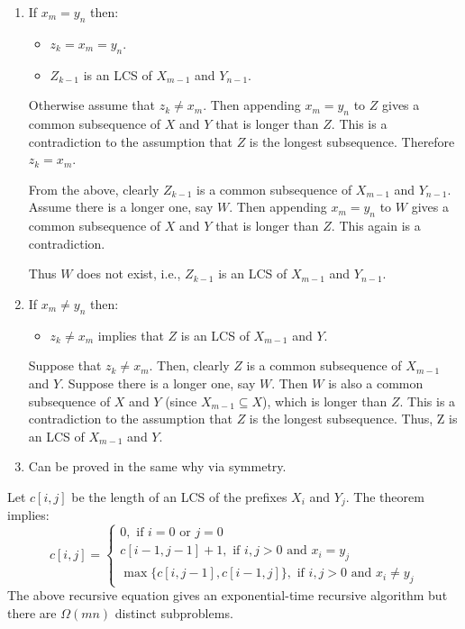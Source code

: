 {\begin{enumerate}
    \item If \(x_m = y_n\) then:
        \begin{itemize}
            \item \(z_k = x_m = y_n\).
            \item \(Z_{k-1}\) is an LCS of \(X_{m-1}\) and \(Y_{n-1}\).
        \end{itemize}
        Otherwise assume that \(z_k \neq x_m\). 
        Then appending \(x_m = y_n\) to \(Z\) gives a common subsequence of \(X\) and \(Y\) that is longer than \(Z\).
        This is a contradiction to the assumption that \(Z\) is the longest subsequence.
        Therefore \(z_k = x_m\).

        From the above, clearly \(Z_{k-1}\) is a common subsequence of \(X_{m-1}\) and \(Y_{n-1}\).
        Assume there is a longer one, say \(W\).
        Then appending \(x_m = y_n\) to \(W\) gives a common subsequence of \(X\) and \(Y\) that is longer than \(Z\).
        This again is a contradiction.

        Thus \(W\) does not exist, i.e., \(Z_{k-1}\) is an LCS of \(X_{m-1}\) and \(Y_{n-1}\).

    \item If \(x_m \neq y_n\) then:
        \begin{itemize}
            \item \(z_k \neq x_m\) implies that \(Z\) is an LCS of \(X_{m-1}\) and \(Y\).
        \end{itemize}
        Suppose that \(z_k \neq x_m\).
        Then, clearly \(Z\) is a common subsequence of \(X_{m-1}\) and \(Y\).
        Suppose there is a longer one, say \(W\).
        Then \(W\) is also a common subsequence of \(X\) and \(Y\) (since \(X_{m-1} \subseteq X\)), which is longer than \(Z\).
        This is a contradiction to the assumption that \(Z\) is the longest subsequence.
        Thus, Z is an LCS of \(X_{m-1}\) and \(Y\).
    \item Can be proved in the same why via symmetry.
\end{enumerate}}

Let \(c[i,j]\) be the length of an LCS of the prefixes \(X_i\) and \(Y_j\).
The theorem implies:
\begin{equation}
    c[i,j] = \begin{cases}
                0, \text{ if } i = 0 \text{ or } j = 0 \\
                c[i-1, j-1] + 1, \text{ if } i,j > 0 \text{ and } x_i = y_j \\
                \max \{ c[i,j-1], c[i-1, j] \}, \text{ if } i,j > 0 \text{ and } x_i \neq y_j
             \end{cases}
\end{equation}
The above recursive equation gives an exponential-time recursive algorithm but there are \(\Omega(mn)\) distinct subproblems.

